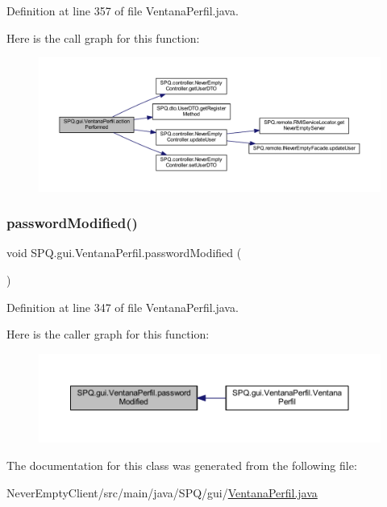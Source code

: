 Definition at line 357 of file Ventana\+Perfil.\+java.

Here is the call graph for this function\+:\nopagebreak
\begin{figure}[H]
\begin{center}
\leavevmode
\includegraphics[width=350pt]{class_s_p_q_1_1gui_1_1_ventana_perfil_ab3748a16025307c203ba1dd2c5385b23_cgraph}
\end{center}
\end{figure}
\mbox{\label{class_s_p_q_1_1gui_1_1_ventana_perfil_a65b1807fdef3dcfdaf5564d2148fc46d}} 
\subsubsection{\texorpdfstring{password\+Modified()}{passwordModified()}}
{\footnotesize\ttfamily void S\+P\+Q.\+gui.\+Ventana\+Perfil.\+password\+Modified (\begin{DoxyParamCaption}{ }\end{DoxyParamCaption})}



Definition at line 347 of file Ventana\+Perfil.\+java.

Here is the caller graph for this function\+:\nopagebreak
\begin{figure}[H]
\begin{center}
\leavevmode
\includegraphics[width=350pt]{class_s_p_q_1_1gui_1_1_ventana_perfil_a65b1807fdef3dcfdaf5564d2148fc46d_icgraph}
\end{center}
\end{figure}


The documentation for this class was generated from the following file\+:\begin{DoxyCompactItemize}
\item 
Never\+Empty\+Client/src/main/java/\+S\+P\+Q/gui/\mbox{\hyperlink{_ventana_perfil_8java}{Ventana\+Perfil.\+java}}\end{DoxyCompactItemize}
